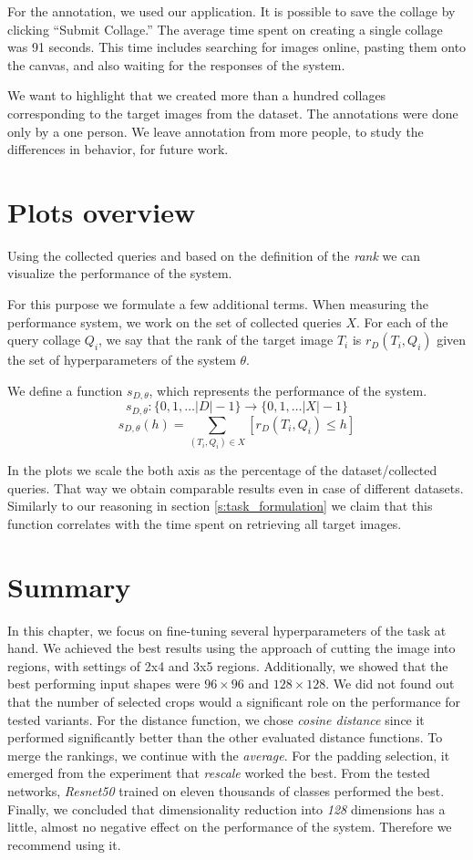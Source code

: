 For the annotation, we used our application. It is possible to save the collage by clicking ``Submit Collage.'' The average time spent on creating a single collage was 91 seconds. This time includes searching for images online, pasting them onto the canvas, and also waiting for the responses of the system.

We want to highlight that we created more than a hundred collages corresponding to the target images from the dataset. The annotations were done only by a one person. We leave annotation from more people, to study the differences in behavior, for future work. 

\section{Plots overview}

Using the collected queries and based on the definition of the \emph{rank} we can visualize the performance of the system.

For this purpose we formulate a few additional terms. When measuring the performance system, we work on the set of collected queries $X$. For each of the query collage $Q_i$, we say that the rank of the target image $T_i$ is $r_D(T_i, Q_i)$ given the set of hyperparameters of the system $\theta$.

We define a function $s_{D, \theta}$, which represents the performance of the system.
$$
s_{D, \theta}:\{0, 1, \ldots |D| - 1\} \rightarrow \{0, 1, \ldots |X| - 1\}
$$  
$$
s_{D, \theta}(h) = \sum_{(T_i, Q_i) \in X}[r_D(T_i, Q_i) \leq h]
$$

In the plots we scale the both axis as the percentage of the dataset/collected queries. That way we obtain comparable results even in case of different datasets. Similarly to our reasoning in section \ref{s:task_formulation} we claim that this function correlates with the time spent on retrieving all target images.


\section{Summary}

In this chapter, we focus on fine-tuning several hyperparameters of the task at hand. We achieved the best results using the approach of cutting the image into regions, with settings of 2x4 and 3x5 regions. Additionally, we showed that the best performing input shapes were $96\times 96$ and $128 \times 128$.  We did not found out that the number of selected crops would a significant role on the performance for tested variants. For the distance function, we chose \emph{cosine distance} since it performed significantly better than the other evaluated distance functions. To merge the rankings, we continue with the \emph{average}. For the padding selection, it emerged from the experiment that \emph{rescale} worked the best. From the tested networks, \emph{Resnet50} trained on eleven thousands of classes performed the best. Finally, we concluded that dimensionality reduction into \emph{128} dimensions has a little, almost no negative effect on the performance of the system. Therefore we recommend using it. 




